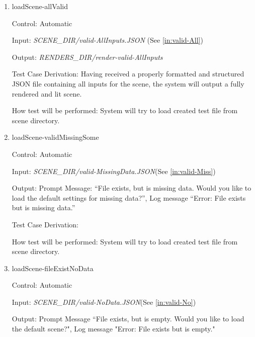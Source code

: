 \documentclass[12pt, titlepage]{article}
\begin{document}
\begin{enumerate}

\item{loadScene-allValid\\}

Control: Automatic
								
Input: \textit{SCENE\_DIR/valid-AllInputs.JSON} (See \ref{in:valid-All})
					
Output: \textit{RENDERS\_DIR/render-valid-AllInputs} 

Test Case Derivation: Having received a properly formatted and structured JSON 
file containing all inputs for the scene, the system will output a fully 
rendered and lit scene.
					
How test will be performed: System will try to load created test file from 
scene directory. 
					
\item{loadScene-validMissingSome\\}

Control: Automatic

Input: \textit{SCENE\_DIR/valid-MissingData.JSON}(See \ref{in:valid-Miss})

Output: Prompt Message: ``File exists, but is missing data. Would you like to 
load the default settings for missing data?'', Log message ``Error: File exists 
but is missing data.''

Test Case Derivation: 

How test will be performed: System will try to load created test file from 
scene directory.

\item{loadScene-fileExistNoData\\}

Control: Automatic
									
Input: \textit{SCENE\_DIR/valid-NoData.JSON}(See \ref{in:valid-No})

Output: Prompt Message ``File exists, but is empty. Would you like to load the 
default scene?", Log message "Error: File exists but is empty."


\end{enumerate}
\end{document}
